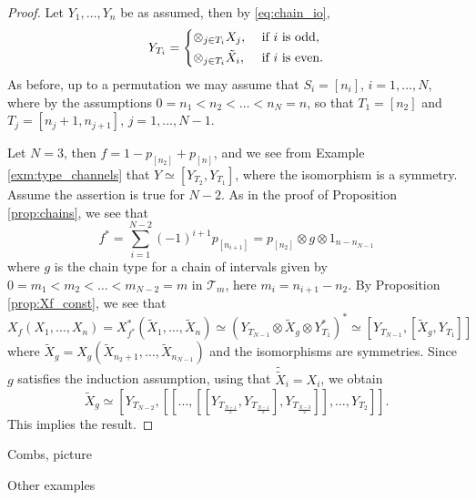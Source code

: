 \documentclass[12pt]{article}
\theoremstyle{definition}
\theoremstyle{remark}
\def\Te{\mathcal T}
\begin{document}
\begin{proof} Let $Y_1,\dots,Y_n$ be as assumed, then  by \eqref{eq:chain_io}, 
\[
Y_{T_i}=\begin{dcases} \otimes_{j\in T_i}X_j,  & \text{ if } i\text{ is odd},\\
\otimes_{j\in T_i}\tilde X_i,& \text{ if }i\text{ is even}.
\end{dcases}
\]
As before, up to a permutation we may assume that $S_i=[n_i]$, $i=1,\dots, N$, where by
the assumptions
$0=n_1<n_2<\dots<n_N=n$, so that $T_1=[n_2]$ and $T_j=[n_j+1,n_{j+1}]$, $j=1,\dots, N-1$. 

Let $N=3$, then $f=1-p_{[n_2]}+p_{[n]}$, and we see from Example \ref{exm:type_channels}
that  $Y\simeq [Y_{T_2}, Y_{T_1}]$, where the isomorphism is a symmetry. 
Assume the assertion is true for  $N-2$.  As in the proof of Proposition \ref{prop:chains}, we see that 
\[
f^*=\sum_{i=1}^{N-2}(-1)^{i+1}p_{[n_{i+1}]}=p_{[n_2]}\otimes g\otimes 1_{n-n_{N-1}}
\]
where $g$ is the chain type for  a chain of intervals given by $0=m_1<m_2<\dots<m_{N-2}=m$ in $\Te_m$,
here $m_i=n_{i+1}-n_2$. By Proposition \ref{prop:Xf_const}, we see that 
\[
X_f(X_1,\dots,X_n)=X_{f^*}^*(\tilde X_1,\dots, \tilde X_n)\simeq (Y_{T_{N-1}}\otimes
\tilde X_g\otimes Y^*_{T_1})^*\simeq [Y_{T_{N-1}},[\tilde X_g,Y_{T_1}]]
\]
where $\tilde X_g=X_g(\tilde X_{n_2+1},\dots, \tilde X_{n_{N-1}})$ and the isomorphisms are
symmetries. Since $g$ satisfies the induction assumption, using that $\tilde {\tilde
X}_i=X_i$, we obtain 
\[
\tilde X_g\simeq
[Y_{T_{N-2}},[[\dots,[[Y_{T_{\frac{N+1}2}},Y_{T_{\frac{N-1}2}}],Y_{T_{\frac{N-3}2}}]],\dots,Y_{T_2}]].
\]
This implies the result.


\end{proof}

Combs, picture

Other examples
\end{document}
